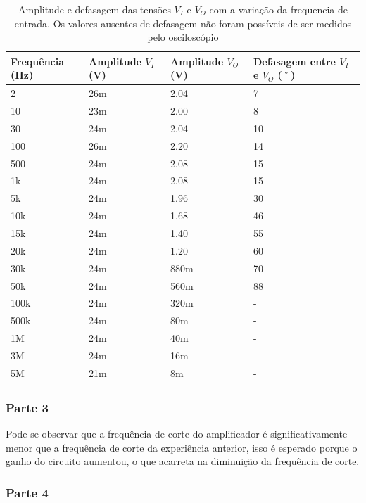 \documentclass{abntex2}
\begin{document}
\begin{table}[h!]
  \centering
  \begin{tabular}[width = 0.8\textwidth]{|l|l|l|l|}
    \hline
    Frequência (Hz) & Amplitude $V_I$ (V) & Amplitude $V_O$ (V) & Defasagem entre $V_I$ e $V_O$ (˚) \\
    \hline
    2 & 26m & 2.04 & 7 \\
    \hline
    10 &  23m & 2.00 & 8 \\
    \hline
    30 &  24m & 2.04 & 10 \\
    \hline
    100 & 26m & 2.20 & 14 \\
    \hline
    500 & 24m & 2.08 & 15 \\
    \hline
    1k &  24m & 2.08 & 15 \\
    \hline
    5k &  24m & 1.96 & 30 \\
    \hline
    10k & 24m & 1.68 & 46 \\
    \hline
    15k & 24m & 1.40 & 55 \\
    \hline
    20k & 24m & 1.20 & 60 \\
    \hline
    30k & 24m & 880m & 70 \\
    \hline
    50k & 24m & 560m & 88 \\
    \hline
    100k & 24m & 320m & - \\
    \hline
    500k & 24m & 80m &  - \\
    \hline
    1M &  24m & 40m  & - \\
    \hline
    3M &  24m & 16m  & - \\
    \hline
    5M &  21m & 8m  &  - \\
    \hline
  \end{tabular}
  \caption{Amplitude e defasagem das tensões $V_I$ e $V_O$ com a variação da frequencia de entrada. Os valores ausentes de defasagem não foram possíveis de ser medidos pelo osciloscópio}
  \label{tab:exp2}
\end{table}

\subsubsection{Parte 3}

Pode-se observar que a frequência de corte do amplificador é significativamente menor que a frequência de corte da experiência anterior, isso é esperado porque o ganho do circuito aumentou, o que acarreta na diminuição da frequência de corte.

\subsubsection{Parte 4}
\end{document}
